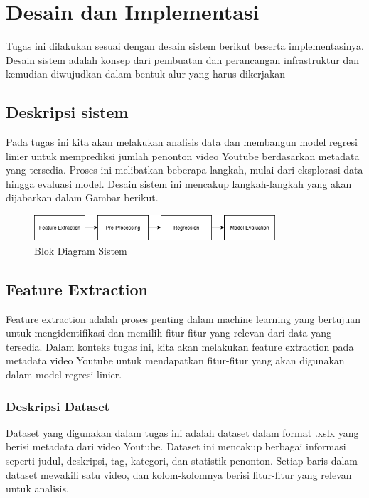 \section{Desain dan Implementasi}

Tugas ini dilakukan sesuai dengan desain sistem berikut beserta implementasinya. Desain sistem adalah konsep dari pembuatan dan perancangan infrastruktur dan kemudian diwujudkan dalam bentuk alur yang harus dikerjakan


\subsection{Deskripsi sistem}
Pada tugas ini kita akan melakukan analisis data dan membangun model regresi linier untuk memprediksi jumlah penonton video Youtube berdasarkan metadata yang tersedia. Proses ini melibatkan beberapa langkah, mulai dari eksplorasi data hingga evaluasi model. Desain sistem ini mencakup langkah-langkah yang akan dijabarkan dalam Gambar berikut.

\begin{figure}[ht]
    \centering
    \includegraphics[width=0.8\textwidth]{gambar/metodologi.png}
    \caption{Blok Diagram Sistem}
    \label{fig:desain_sistem}
\end{figure}

\subsection{Feature Extraction}
Feature extraction adalah proses penting dalam machine learning yang bertujuan untuk mengidentifikasi dan memilih fitur-fitur yang relevan dari data yang tersedia. Dalam konteks tugas ini, kita akan melakukan feature extraction pada metadata video Youtube untuk mendapatkan fitur-fitur yang akan digunakan dalam model regresi linier.

\subsubsection{Deskripsi Dataset}
Dataset yang digunakan dalam tugas ini adalah dataset dalam format .xslx yang berisi metadata dari video Youtube. Dataset ini mencakup berbagai informasi seperti judul, deskripsi, tag, kategori, dan statistik penonton. Setiap baris dalam dataset mewakili satu video, dan kolom-kolomnya berisi fitur-fitur yang relevan untuk analisis. 
\newpage